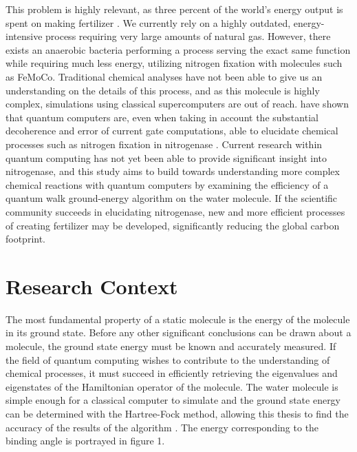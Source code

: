 \documentclass{article}
\begin{document}
This problem is highly relevant, as three percent of the world's energy output is spent on making fertilizer \cite{reiher}. We currently rely on a highly outdated, energy-intensive process requiring very large amounts of natural gas. However, there exists an anaerobic bacteria performing a process serving the exact same function while requiring much less energy, utilizing nitrogen fixation with molecules such as FeMoCo. Traditional chemical analyses have not been able to give us an understanding on the details of this process, and as this molecule is highly complex, simulations using classical supercomputers are out of reach. \textcite{reiher} have shown that quantum computers are, even when taking in account the substantial decoherence and error of current gate computations, able to elucidate chemical processes such as nitrogen fixation in nitrogenase \cite{reiher}. Current research within quantum computing has not yet been able to provide significant insight into nitrogenase, and this study aims to build towards understanding more complex chemical reactions with quantum computers by examining the efficiency of a quantum walk ground-energy algorithm on the water molecule. If the scientific community succeeds in elucidating nitrogenase, new and more efficient processes of creating fertilizer may be developed, significantly reducing the global carbon footprint.


\section{Research Context}

The most fundamental property of a static molecule is the energy of the  molecule in its ground state. Before any other significant conclusions can be drawn about a molecule, the ground state energy must be known and accurately measured. If the field of quantum computing wishes to contribute to the understanding of chemical processes, it must succeed in efficiently retrieving the eigenvalues and eigenstates of the Hamiltonian operator of the molecule. The water molecule is simple enough for a classical computer to simulate and the ground state energy can be determined with the Hartree-Fock method, allowing this thesis to find the accuracy of the results of the algorithm \cite{smith}. The energy corresponding to the binding angle is portrayed in figure 1.
\end{document}

